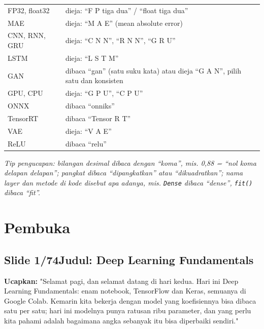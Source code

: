 \documentclass[11pt]{article}
\renewcommand{\framebox}[1]{\colorbox{acc!15}{\textcolor{acc}{\textbf{#1}}}}
\begin{document}
\begin{longtable}{@{}p{} p{}@{}}
FP32, float32 & dieja: ``F P tiga dua'' / ``float tiga dua'' \\
MAE & dieja: ``M A E'' (mean absolute error) \\
CNN, RNN, GRU & dieja: ``C N N'', ``R N N'', ``G R U'' \\
LSTM & dieja: ``L S T M'' \\
GAN & dibaca ``gan'' (satu suku kata) atau dieja ``G A N'', pilih satu dan konsisten \\
GPU, CPU & dieja: ``G P U'', ``C P U'' \\
ONNX & dibaca ``onniks'' \\
TensorRT & dibaca ``Tensor R T'' \\
VAE & dieja: ``V A E'' \\
ReLU & dibaca ``relu'' \\
\hline
\end{longtable}

\vspace{2mm}
\emph{Tip pengucapan: bilangan desimal dibaca dengan ``koma'', mis. 0,88 = ``nol koma delapan delapan''; pangkat dibaca ``dipangkatkan'' atau ``dikuadratkan''; nama layer dan metode di kode disebut apa adanya, mis. \texttt{Dense} dibaca ``dense'', \texttt{fit()} dibaca ``fit''.}

\newpage
\tableofcontents
\newpage

\section{Pembuka}

\subsection*{\framebox{Slide 1/74}\quad Judul: Deep Learning Fundamentals}
\textbf{Ucapkan:} "Selamat pagi, dan selamat datang di hari kedua. Hari ini Deep Learning Fundamentals: enam notebook, TensorFlow dan Keras, semuanya di Google Colab. Kemarin kita bekerja dengan model yang koefisiennya bisa dibaca satu per satu; hari ini modelnya punya ratusan ribu parameter, dan yang perlu kita pahami adalah bagaimana angka sebanyak itu bisa diperbaiki sendiri."\\[2pt]
\end{document}
